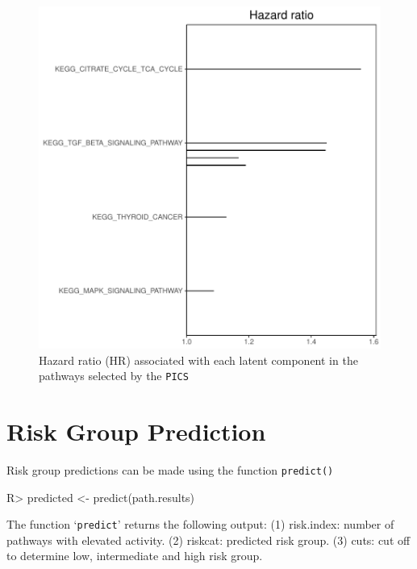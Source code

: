 \documentclass[11pt]{article}
\begin{document}
\begin{figure}[tbh]
\begin{center}
\includegraphics{PICS-example-plot1}
\caption{Hazard ratio (HR) associated with each latent component in the pathways selected by the \texttt{PICS}}
\end{center}
\end{figure}

\section{Risk Group Prediction}
Risk group predictions can be made using the function \texttt{predict()}

\begin{Schunk}
\begin{Sinput}
R> predicted <- predict(path.results)
\end{Sinput}
\end{Schunk}

The function `\texttt{predict}' returns the following output:
(1) risk.index: number of pathways with elevated activity.
(2) riskcat: predicted risk group.
(3) cuts: cut off to determine low, intermediate and high risk group.
\end{document}
